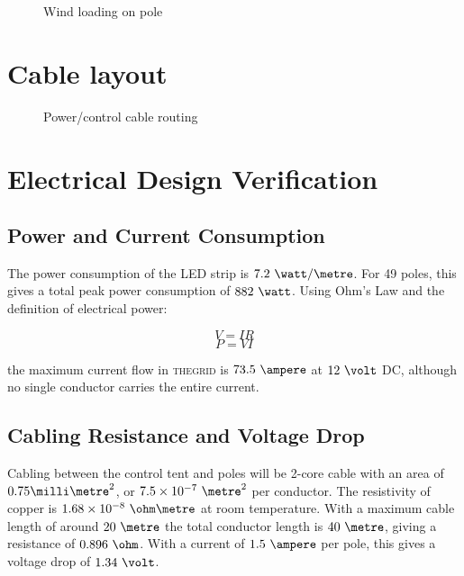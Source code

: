 \documentclass[12pt]{article} %
\newcommand{\thegrid}{\textsc{the\textperiodcentered grid}\xspace}
\begin{document}
\begin{appendices}
\begin{figure}[h]
    \caption{Wind loading on pole}
\end{figure}



\FloatBarrier
\clearpage
\section{Cable layout}
\begin{figure}[h]
    \centering
    \caption{Power/control cable routing}
\end{figure}


\section{Electrical Design Verification}
\subsection{Power and Current Consumption}
The power consumption of the LED strip is $7.2~\watt/\metre$.  For 49 poles,
this gives a total peak power consumption of $882~\watt$.  Using Ohm's Law and
the definition of electrical power:

$$ V = IR $$
$$ P = VI $$

the maximum current flow in \thegrid is $73.5~\ampere$ at $12~\volt$ DC,
although no single conductor carries the entire current.

\subsection{Cabling Resistance and Voltage Drop}
Cabling between the control tent and poles will be 2-core cable with an area of
$0.75\milli\metre^2$, or $7.5 \times 10^{-7}~\metre^2$ per conductor.  The
resistivity of copper is $1.68 \times 10^{-8}~\ohm\metre$ at room temperature.
With a maximum cable length of around $20~\metre$ the total conductor length is
$40~\metre$, giving a resistance of $0.896~\ohm$.  With a current of
$1.5~\ampere$ per pole, this gives a voltage drop of $1.34~\volt$.


\end{appendices}
\end{document}
